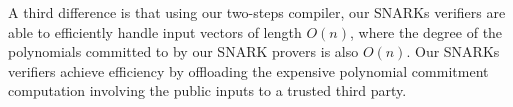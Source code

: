 \noindent A third difference is that using our two-steps compiler, our SNARKs verifiers are able to efficiently handle input vectors of length $O(n)$, 
where the degree of the polynomials committed to by our SNARK provers is also $O(n)$. Our SNARKs verifiers achieve efficiency by offloading the 
expensive polynomial commitment computation involving the public inputs to a trusted third party. \\

